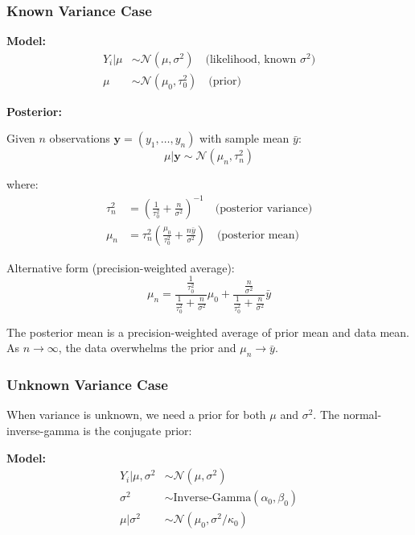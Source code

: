 \subsubsection{Known Variance Case}

\textbf{Model:}
\begin{align}
Y_i | \mu &\sim \mathcal{N}(\mu, \sigma^2) \quad \text{(likelihood, known $\sigma^2$)} \\
\mu &\sim \mathcal{N}(\mu_0, \tau_0^2) \quad \text{(prior)}
\end{align}

\textbf{Posterior:}

\begin{theorem}
Given $n$ observations $\mathbf{y} = (y_1, \ldots, y_n)$ with sample mean $\bar{y}$:
\begin{equation}
\mu | \mathbf{y} \sim \mathcal{N}(\mu_n, \tau_n^2)
\end{equation}

where:
\begin{align}
\tau_n^2 &= \left(\frac{1}{\tau_0^2} + \frac{n}{\sigma^2}\right)^{-1} \quad \text{(posterior variance)} \\
\mu_n &= \tau_n^2 \left(\frac{\mu_0}{\tau_0^2} + \frac{n\bar{y}}{\sigma^2}\right) \quad \text{(posterior mean)}
\end{align}

Alternative form (precision-weighted average):
\begin{equation}
\mu_n = \frac{\frac{1}{\tau_0^2}}{\frac{1}{\tau_0^2} + \frac{n}{\sigma^2}} \mu_0 + \frac{\frac{n}{\sigma^2}}{\frac{1}{\tau_0^2} + \frac{n}{\sigma^2}} \bar{y}
\end{equation}
\end{theorem}

The posterior mean is a precision-weighted average of prior mean and data mean. As $n \to \infty$, the data overwhelms the prior and $\mu_n \to \bar{y}$.

\subsubsection{Unknown Variance Case}

When variance is unknown, we need a prior for both $\mu$ and $\sigma^2$. The normal-inverse-gamma is the conjugate prior:

\textbf{Model:}
\begin{align}
Y_i | \mu, \sigma^2 &\sim \mathcal{N}(\mu, \sigma^2) \\
\sigma^2 &\sim \text{Inverse-Gamma}(\alpha_0, \beta_0) \\
\mu | \sigma^2 &\sim \mathcal{N}(\mu_0, \sigma^2/\kappa_0)
\end{align}

